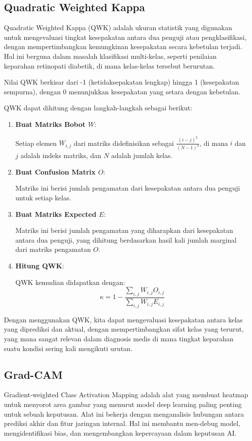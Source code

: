 \subsection{Quadratic Weighted Kappa}

Quadratic Weighted Kappa (QWK) adalah ukuran statistik yang digunakan untuk mengevaluasi tingkat kesepakatan antara dua penguji atau pengklasifikasi, dengan mempertimbangkan kemungkinan kesepakatan secara kebetulan terjadi. Hal ini berguna dalam masalah klasifikasi multi-kelas, seperti penilaian keparahan retinopati diabetik, di mana kelas-kelas tersebut berurutan.

Nilai QWK berkisar dari -1 (ketidaksepakatan lengkap) hingga 1 (kesepakatan sempurna), dengan 0 menunjukkan kesepakatan yang setara dengan kebetulan.

QWK dapat dihitung dengan langkah-langkah sebagai berikut:

\begin{enumerate}
    \item \textbf{Buat Matriks Bobot \(W\)}:
    
    Setiap elemen \(W_{i,j}\) dari matriks didefinisikan sebagai \(\frac{(i - j)^2}{(N - 1)^2}\), di mana \(i\) dan \(j\) adalah indeks matriks, dan \(N\) adalah jumlah kelas.
    
    \item \textbf{Buat Confusion Matrix \(O\)}:
    
    Matriks ini berisi jumlah pengamatan dari kesepakatan antara dua penguji untuk setiap kelas.
    
    \item \textbf{Buat Matriks Expected \(E\)}:
     
    Matriks ini berisi jumlah pengamatan yang diharapkan dari kesepakatan antara dua penguji, yang dihitung berdasarkan hasil kali jumlah marginal dari matriks pengamatan \(O\).
    
    \item \textbf{Hitung QWK}:
    
    QWK kemudian didapatkan dengan:
    \[
    \kappa = 1 - \frac{\sum_{i,j} W_{i,j} O_{i,j}}{\sum_{i,j} W_{i,j} E_{i,j}}
    \]
\end{enumerate}

Dengan menggunakan QWK, kita dapat mengevaluasi kesepakatan antara kelas yang diprediksi dan aktual, dengan mempertimbangkan sifat kelas yang terurut, yang mana sangat relevan dalam diagnosis medis di mana tingkat keparahan suatu kondisi sering kali mengikuti urutan.

\subsection{Grad-CAM}
\label{sec:225}

Gradient-weighted Class Activation Mapping adalah alat yang membuat heatmap untuk menyorot area gambar yang menurut model deep learning paling penting untuk sebuah keputusan. Alat ini bekerja dengan menganalisis hubungan antara prediksi akhir dan fitur jaringan internal. Hal ini membantu men-debug model, mengidentifikasi bias, dan mengembangkan kepercayaan dalam keputusan AI.
